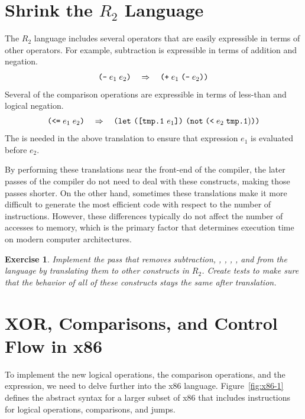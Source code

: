 \documentclass[11pt]{book}
\newtheorem{exercise}[theorem]{Exercise}
\begin{document}
\section{Shrink the $R_2$ Language}
\label{sec:shrink-r2}

The $R_2$ language includes several operators that are easily
expressible in terms of other operators. For example, subtraction is
expressible in terms of addition and negation.
\[
 \texttt{(-}\; e_1 \; e_2\texttt{)} \quad \Rightarrow \quad \texttt{(}\texttt{+} \; e_1 \; \texttt{(}\texttt{-} \; e_2\texttt{)}\texttt{)}
\]
Several of the comparison operations are expressible in terms of
less-than and logical negation.
\[
\texttt{(}\texttt{<=}\; e_1 \; e_2\texttt{)} \quad \Rightarrow \quad
\texttt{(}\texttt{let}~\texttt{(}\texttt{[}\texttt{tmp.1}~e_1\texttt{]}\texttt{)}~\texttt{(}\texttt{not}\;\texttt{(}\texttt{<}\;e_2\;\texttt{tmp.1})\texttt{)}\texttt{)}
\]
The  is needed in the above translation to ensure that
expression $e_1$ is evaluated before $e_2$.

By performing these translations near the front-end of the compiler,
the later passes of the compiler do not need to deal with these
constructs, making those passes shorter. On the other hand, sometimes
these translations make it more difficult to generate the most
efficient code with respect to the number of instructions. However,
these differences typically do not affect the number of accesses to
memory, which is the primary factor that determines execution time on
modern computer architectures.

\begin{exercise}\normalfont
  Implement the pass  that removes subtraction,
  , , \key{<=}, \key{>}, and \key{>=} from the language
  by translating them to other constructs in $R_2$.  Create tests to
  make sure that the behavior of all of these constructs stays the
  same after translation.
\end{exercise}


\section{XOR, Comparisons, and Control Flow in x86}
\label{sec:x86-1}

To implement the new logical operations, the comparison operations,
and the  expression, we need to delve further into the x86
language. Figure~\ref{fig:x86-1} defines the abstract syntax for a
larger subset of x86 that includes instructions for logical
operations, comparisons, and jumps.
\end{document}

